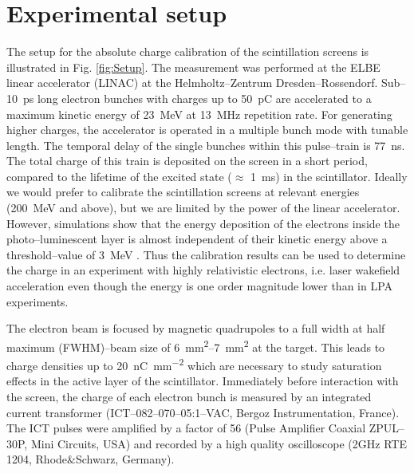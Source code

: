 \documentclass[%
reprint,
amsmath,
amssymb,
aip,
rsi, 
numerical,
floatfix,
]{revtex4-1}
\newcommand{\myCite}[1]{\textcolor{blue}{\cite{#1}}}
\begin{document}
\section{\label{Set} Experimental setup}

The setup for the absolute charge calibration of the scintillation screens is illustrated in Fig. \ref{fig:Setup}.
The measurement was performed at the ELBE linear accelerator (LINAC) at the Helmholtz--Zentrum Dresden--Rossendorf. 
Sub--\SI{10}{\pico\second} long electron bunches with charges up to \SI{50}{\pico\coulomb} are accelerated to a maximum kinetic energy of \SI{23}{\mega\electronvolt} at \SI{13}{\mega\hertz} repetition rate. 
For generating higher charges, the accelerator is operated in a multiple bunch mode with tunable length. 
The temporal delay of the single bunches within this pulse--train is \SI{77}{\nano\second}. 
The total charge of this train is deposited on the screen in a short period, compared to the lifetime of the excited state ($\approx$ \SI{1}{\milli\second}) in the scintillator\myCite{Morlotti1997}.
Ideally we would prefer to calibrate the scintillation screens at relevant energies (\SI{200}{\mega\electronvolt} and above), but we are limited by the power of the linear accelerator.
However, simulations show that the energy deposition of the electrons inside the photo--luminescent layer is almost independent of their kinetic energy above a threshold--value of \SI{3}{\mega\electronvolt} \myCite{Hidding2007,Glinec2006,Masuda2008}.
Thus the calibration results can be used to determine the charge in an experiment with highly relativistic electrons, i.e. laser wakefield acceleration even though the energy is one order magnitude lower than in LPA experiments. 

The electron beam is focused by magnetic quadrupoles to a full width at half maximum (FWHM)--beam size of \SIrange{6}{7}{\milli\metre^2} at the target.
This leads to charge densities up to \SI[per-mode=symbol]{20}{\nano\coulomb \per \square\milli\meter} which are necessary to study saturation effects in the active layer of the scintillator.
Immediately before interaction with the screen, the charge of each electron bunch is measured by an integrated current transformer (ICT--082--070--05:1--VAC, Bergoz Instrumentation, France). 
The ICT pulses were amplified by a factor of 56 (Pulse Amplifier Coaxial ZPUL--30P, Mini Circuits, USA) and recorded by a high quality oscilloscope (2GHz RTE 1204, Rhode$\&$Schwarz, Germany).
\end{document}
